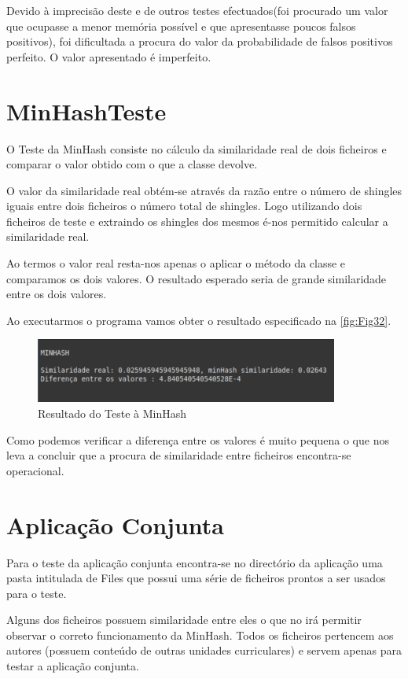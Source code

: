 \documentclass{report}
\begin{document}
Devido à imprecisão deste e de outros testes efectuados(foi procurado um valor que ocupasse a menor memória possível e que apresentasse poucos falsos positivos), foi dificultada a procura do valor da probabilidade de falsos positivos perfeito. O valor apresentado é imperfeito.

\section{MinHashTeste}

O Teste da MinHash consiste no cálculo da similaridade real de dois ficheiros e comparar o valor obtido com o que a classe devolve.

O valor da similaridade real obtém-se através da razão entre o número de shingles iguais entre dois ficheiros o número total de shingles. Logo utilizando dois ficheiros de teste e extraindo os shingles dos mesmos é-nos permitido calcular a similaridade real. 

Ao termos o valor real resta-nos apenas o aplicar o método da classe e comparamos os dois valores. O resultado esperado seria de grande similaridade entre os dois valores.

Ao executarmos o programa vamos obter o resultado especificado na 
\autoref{fig:Fig32}.

\begin{figure}[h]
\center %
\includegraphics[height=60pt]{MinHash.png}
\caption{Resultado do Teste à MinHash}
\label{fig:Fig32}
\end{figure}

Como podemos verificar a diferença entre os valores é muito pequena o que nos leva a concluir que a procura de similaridade entre ficheiros encontra-se operacional.

\section{Aplicação Conjunta}

Para o teste da aplicação conjunta encontra-se no directório da aplicação uma pasta intitulada de Files que possui uma série de ficheiros prontos a ser usados para o teste.

Alguns dos ficheiros possuem similaridade entre eles o que no irá permitir observar o correto funcionamento da MinHash. Todos os ficheiros pertencem aos autores (possuem conteúdo de outras unidades curriculares) e servem apenas para testar a aplicação conjunta. 
\end{document}
